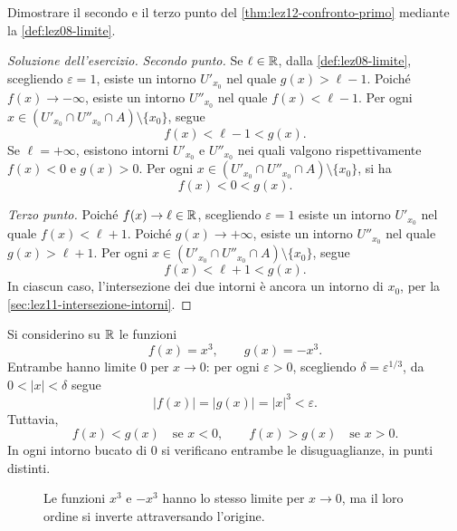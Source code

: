 \clearpage

\begin{exercise}
\label{ex:lez12-confronto-primo-infiniti}
Dimostrare il secondo e il terzo punto del
\cref{thm:lez12-confronto-primo} mediante la
\cref{def:lez08-limite}.
\end{exercise}

\begin{proof}[Soluzione dell'esercizio]
\emph{Secondo punto.}
Se \(\ell\in\mathbb{R}\), dalla \cref{def:lez08-limite},
scegliendo \(\varepsilon=1\), esiste un intorno
\(U'_{x_0}\) nel quale \(g(x)>\ell-1\).
Poiché \(f(x)\to-\infty\), esiste un intorno
\(U''_{x_0}\) nel quale \(f(x)<\ell-1\).
Per ogni \(x\in(U'_{x_0}\cap U''_{x_0}\cap A)
\setminus\{x_0\}\), segue
\[
  f(x)<\ell-1<g(x).
\]
Se \(\ell=+\infty\), esistono intorni
\(U'_{x_0}\) e \(U''_{x_0}\) nei quali valgono
rispettivamente \(f(x)<0\) e \(g(x)>0\).
Per ogni \(x\in(U'_{x_0}\cap U''_{x_0}\cap A)\setminus\{x_0\}\),
si ha
\[
  f(x)<0<g(x).
\]

\emph{Terzo punto.}
Poiché \(f(x)\to\ell\in\mathbb{R}\), scegliendo
\(\varepsilon=1\) esiste un intorno \(U'_{x_0}\)
nel quale \(f(x)<\ell+1\).
Poiché \(g(x)\to+\infty\), esiste un intorno
\(U''_{x_0}\) nel quale \(g(x)>\ell+1\).
Per ogni \(x\in(U'_{x_0}\cap U''_{x_0}\cap A)
\setminus\{x_0\}\), segue
\[
  f(x)<\ell+1<g(x).
\]
In ciascun caso, l'intersezione dei due intorni è ancora
un intorno di \(x_0\), per la
\cref{sec:lez11-intersezione-intorni}.
\end{proof}

\begin{example}
\label{ex:lez12-limiti-uguali-ordine}
Si considerino su \(\mathbb{R}\) le funzioni
\[
  f(x)=x^3,
  \qquad g(x)=-x^3.
\]
Entrambe hanno limite \(0\) per \(x\to0\):
per ogni \(\varepsilon>0\), scegliendo
\(\delta=\varepsilon^{1/3}\), da \(0<|x|<\delta\)
segue
\[
  |f(x)|=|g(x)|=|x|^3<\varepsilon.
\]
Tuttavia,
\[
  f(x)<g(x)\quad\text{se }x<0,
  \qquad
  f(x)>g(x)\quad\text{se }x>0.
\]
In ogni intorno bucato di \(0\) si verificano entrambe
le disuguaglianze, in punti distinti.
\end{example}

\begin{figure}[htbp]
  \centering
  
  \caption{Le funzioni \(x^3\) e \(-x^3\) hanno lo
  stesso limite per \(x\to0\), ma il loro ordine si
  inverte attraversando l'origine.}
  \label{fig:lez12-limiti-uguali-ordine}
\end{figure}

